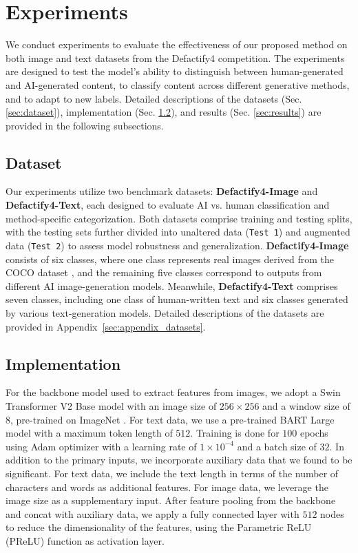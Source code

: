 \section{Experiments}
\label{sec:exp}
We conduct experiments to evaluate the effectiveness of our proposed method on both image and text datasets from the Defactify4 competition. The experiments are designed to test the model’s ability to distinguish between human-generated and AI-generated content, to classify content across different generative methods, and to adapt to new labels. Detailed descriptions of the datasets (Sec. \ref{sec:dataset}), implementation (Sec. \ref{sec:implementation}), and results (Sec. \ref{sec:results}) are provided in the following subsections.


\subsection{Dataset}
Our experiments utilize two benchmark datasets: \textbf{Defactify4-Image} and \textbf{Defactify4-Text}, each designed to evaluate AI vs. human classification and method-specific categorization. Both datasets comprise training and testing splits, with the testing sets further divided into unaltered data (\texttt{Test 1}) and augmented data (\texttt{Test 2}) to assess model robustness and generalization. \textbf{Defactify4-Image} consists of six classes, where one class represents real images derived from the COCO dataset \cite{lin2014microsoft}, and the remaining five classes correspond to outputs from different AI image-generation models. Meanwhile, \textbf{Defactify4-Text} comprises seven classes, including one class of human-written text and six classes generated by various text-generation models. Detailed descriptions of the datasets are provided in Appendix~\ref{sec:appendix_datasets}.


\subsection{Implementation}
\label{sec:implementation}
For the backbone model used to extract features from images, we adopt a Swin Transformer V2 Base model \cite{liu2022swin} with an image size of $256 \times 256$ and a window size of $8$, pre-trained on ImageNet \cite{deng2009imagenet}. For text data, we use a pre-trained BART Large model \cite{lewis2019bart} with a maximum token length of $512$. Training is done for $100$ epochs using Adam optimizer \cite{kingma2014adam} with a learning rate of $1 \times 10^{-4}$ and a batch size of $32$. In addition to the primary inputs, we incorporate auxiliary data that we found to be significant. For text data, we include the text length in terms of the number of characters and words as additional features. For image data, we leverage the image size as a supplementary input. After feature pooling from the backbone and concat with auxiliary data, we apply a fully connected layer with $512$ nodes to reduce the dimensionality of the features, using the Parametric ReLU (PReLU) function as activation layer.

